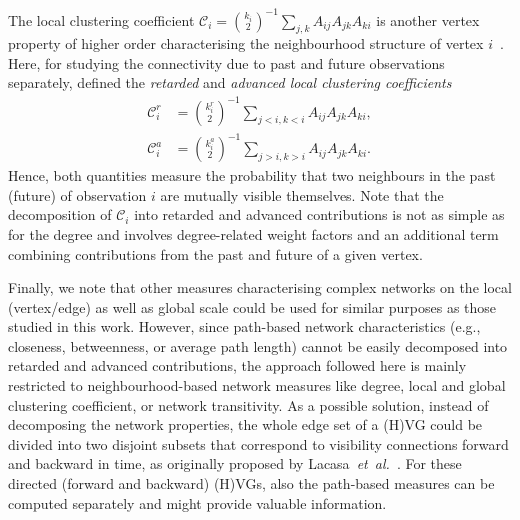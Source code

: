 		The local clustering coefficient $\mathcal{C}_i = {k_i \choose 2}^{-1} \sum_{j,k} A_{ij} A_{jk} A_{ki}$ is another vertex property of higher order characterising the neighbourhood structure of vertex $i$~\cite{Newman2003}. Here, for studying the connectivity due to past and future observations separately, \cite{Donges2013} defined the \emph{retarded} and \emph{{advanced local clustering coefficients}}
\begin{eqnarray} \label{eq:cvin}
\mathcal{C}_i^r &= {k_i^r \choose 2}^{-1} \sum_{{j<i,k<i}} A_{ij} A_{jk} A_{ki},\\ \label{eq:cvout}
\mathcal{C}_i^a &= {k_i^a \choose 2}^{-1} \sum_{{j>i,k>i}} A_{ij} A_{jk} A_{ki}.
\end{eqnarray}
Hence, both quantities measure the probability that two neighbours in the past (future) of observation $i$ are mutually visible themselves. Note that the decomposition of $\mathcal{C}_i$ into retarded and advanced contributions is not as simple as for the degree and involves degree-related weight factors and an additional term combining contributions from the past and future of a given vertex.

		Finally, {we note that} other measures characterising complex networks on the local (vertex/edge) as well as global scale could be used for similar purposes as {those} studied in this work. However, {since} path-based network characteristics {(e.g.,} closeness, betweenness, or average path length{)} cannot be easily decomposed into retarded and advanced contributions, the approach followed here is mainly restricted to neighbourhood-based network measures like degree, local and global clustering coefficient, or network transitivity. As a possible solution, instead of decomposing the network properties, the whole edge set of a (H)VG could be divided into two disjoint subsets that correspond to visibility connections forward and backward in time, as originally proposed by Lacasa~\textit{et~al.}~\cite{Lacasa2012}. For these directed (forward and backward) (H)VGs, also the path-based measures can be computed separately and might provide valuable information. 
		
